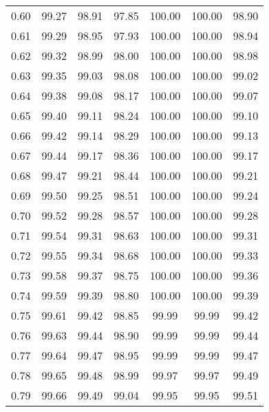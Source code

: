 \begin{tabular}{|c|c|c|c|c|c|c|}
      0.60 &     99.27 &     98.91 &      97.85 &  100.00 &     100.00 &         98.90 \\
      0.61 &     99.29 &     98.95 &      97.93 &  100.00 &     100.00 &         98.94 \\
      0.62 &     99.32 &     98.99 &      98.00 &  100.00 &     100.00 &         98.98 \\
      0.63 &     99.35 &     99.03 &      98.08 &  100.00 &     100.00 &         99.02 \\
      0.64 &     99.38 &     99.08 &      98.17 &  100.00 &     100.00 &         99.07 \\
      0.65 &     99.40 &     99.11 &      98.24 &  100.00 &     100.00 &         99.10 \\
      0.66 &     99.42 &     99.14 &      98.29 &  100.00 &     100.00 &         99.13 \\
      0.67 &     99.44 &     99.17 &      98.36 &  100.00 &     100.00 &         99.17 \\
      0.68 &     99.47 &     99.21 &      98.44 &  100.00 &     100.00 &         99.21 \\
      0.69 &     99.50 &     99.25 &      98.51 &  100.00 &     100.00 &         99.24 \\
      0.70 &     99.52 &     99.28 &      98.57 &  100.00 &     100.00 &         99.28 \\
      0.71 &     99.54 &     99.31 &      98.63 &  100.00 &     100.00 &         99.31 \\
      0.72 &     99.55 &     99.34 &      98.68 &  100.00 &     100.00 &         99.33 \\
      0.73 &     99.58 &     99.37 &      98.75 &  100.00 &     100.00 &         99.36 \\
      0.74 &     99.59 &     99.39 &      98.80 &  100.00 &     100.00 &         99.39 \\
      0.75 &     99.61 &     99.42 &      98.85 &   99.99 &      99.99 &         99.42 \\
      0.76 &     99.63 &     99.44 &      98.90 &   99.99 &      99.99 &         99.44 \\
      0.77 &     99.64 &     99.47 &      98.95 &   99.99 &      99.99 &         99.47 \\
      0.78 &     99.65 &     99.48 &      98.99 &   99.97 &      99.97 &         99.49 \\
      0.79 &     99.66 &     99.49 &      99.04 &   99.95 &      99.95 &         99.51 \\

\end{tabular}
